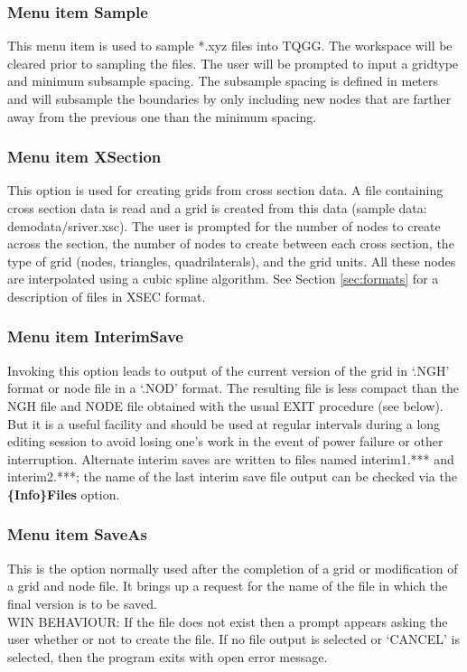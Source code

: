 \documentclass{article}
\begin{document}
\subsubsection[Menu item Sample]{Menu item Sample}
This menu item is used to sample *.xyz files into TQGG. The workspace will be cleared prior to sampling the files.
The user will be prompted to input a gridtype and minimum subsample spacing. The subsample spacing is defined in meters and will subsample the boundaries by only including new nodes that are farther away from the previous one than the minimum spacing.

\subsubsection[Menu item CrossSection]{Menu item XSection}
This option is used for creating grids from cross section data. A file containing cross section data is read and a grid is created from this data (sample data: demodata/sriver.xsc). The user is prompted for the number of nodes to create across the section, the number of nodes to create between each cross section, the type of grid (nodes, triangles, quadrilaterals), and the grid units. All these nodes are interpolated using a cubic spline algorithm. See Section \ref{sec:formats} for a description of files in XSEC format.

\subsubsection[Menu item InterimSave]{Menu item InterimSave}
Invoking this option leads to output of the current version of the grid in `.NGH' format or node file in a `.NOD' format. The resulting file is less compact than the NGH file and NODE file obtained with the usual EXIT procedure (see below). But it is a useful facility and should be used at regular intervals during a long editing session to avoid losing one's work in the event of power failure or other interruption. Alternate interim saves are written to files named interim1.*** and interim2.***; the name of the last interim save file output can be checked via the \textbf{\{Info\}Files} option.

\subsubsection[Menu item SaveAs]{Menu item SaveAs}
This is the option normally used after the completion of a grid or modification of a grid and node file. It brings up a request for the name of the file in which the final version is to be saved. \\
WIN BEHAVIOUR: If the file does not exist then a prompt appears asking the user whether or not to create the file. If no file output is selected or `CANCEL' is selected, then the program exits with open error message.
\end{document}
